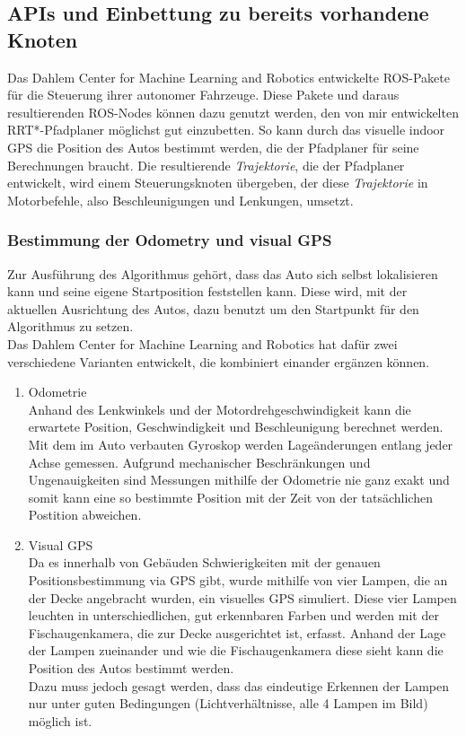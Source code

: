 \subsection{APIs und Einbettung zu bereits vorhandene Knoten}
Das Dahlem Center for Machine Learning and Robotics entwickelte ROS-Pakete für die Steuerung ihrer autonomer Fahrzeuge. Diese Pakete und daraus resultierenden ROS-Nodes können dazu genutzt werden, den von mir entwickelten RRT*-Pfadplaner möglichst gut einzubetten. So kann durch das visuelle indoor GPS die Position des Autos bestimmt werden, die der Pfadplaner für seine Berechnungen braucht. Die resultierende \textit{Trajektorie}, die der Pfadplaner entwickelt, wird einem Steuerungsknoten übergeben, der diese \textit{Trajektorie} in Motorbefehle, also Beschleunigungen und Lenkungen, umsetzt. 
\subsubsection{Bestimmung der Odometry und visual GPS}
Zur Ausführung des Algorithmus gehört, dass das Auto sich selbst lokalisieren kann und seine eigene Startposition feststellen kann. Diese wird, mit der aktuellen Ausrichtung des Autos, dazu benutzt um den Startpunkt für den Algorithmus zu setzen. \\
Das Dahlem Center for Machine Learning and Robotics hat dafür zwei verschiedene Varianten entwickelt, die kombiniert einander ergänzen können. \\
\begin{enumerate}
\item Odometrie \\
Anhand des Lenkwinkels und der Motordrehgeschwindigkeit kann die erwartete Position, Geschwindigkeit und Beschleunigung berechnet werden. Mit dem im Auto verbauten Gyroskop werden Lageänderungen entlang jeder Achse gemessen. Aufgrund mechanischer Beschränkungen und Ungenauigkeiten sind Messungen mithilfe der Odometrie nie ganz exakt und somit kann eine so bestimmte Position mit der Zeit von der tatsächlichen Postition abweichen.
\item Visual GPS\\
Da es innerhalb von Gebäuden Schwierigkeiten mit der genauen Positionsbestimmung via GPS gibt, wurde mithilfe von vier Lampen, die an der Decke angebracht wurden, ein visuelles GPS simuliert. Diese vier Lampen leuchten in unterschiedlichen, gut erkennbaren Farben und werden mit der Fischaugenkamera, die zur Decke ausgerichtet ist, erfasst. Anhand der Lage der Lampen zueinander und wie die Fischaugenkamera diese sieht kann die Position des Autos bestimmt werden.\\
Dazu muss jedoch gesagt werden, dass das eindeutige Erkennen der Lampen nur unter guten Bedingungen (Lichtverhältnisse, alle 4 Lampen im Bild) möglich ist. 
\end{enumerate}

